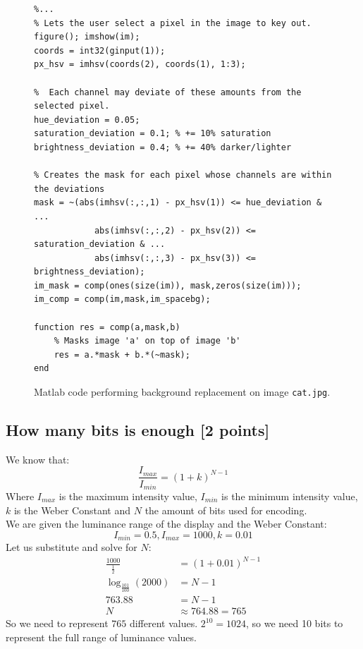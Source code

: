 \documentclass[tikz,14pt,fleqn]{article}
\begin{document}
\begin{figure}[h!]
    \begin{verbatim} 
%...
% Lets the user select a pixel in the image to key out.
figure(); imshow(im);
coords = int32(ginput(1));
px_hsv = imhsv(coords(2), coords(1), 1:3);

%  Each channel may deviate of these amounts from the selected pixel.
hue_deviation = 0.05;
saturation_deviation = 0.1; % += 10% saturation
brightness_deviation = 0.4; % += 40% darker/lighter

% Creates the mask for each pixel whose channels are within the deviations
mask = ~(abs(imhsv(:,:,1) - px_hsv(1)) <= hue_deviation & ...
            abs(imhsv(:,:,2) - px_hsv(2)) <= saturation_deviation & ...
            abs(imhsv(:,:,3) - px_hsv(3)) <= brightness_deviation);
im_mask = comp(ones(size(im)), mask,zeros(size(im)));
im_comp = comp(im,mask,im_spacebg);

function res = comp(a,mask,b)
    % Masks image 'a' on top of image 'b'
    res = a.*mask + b.*(~mask);
end
    \end{verbatim}
\caption{Matlab code performing background replacement on image \texttt{cat.jpg}.}
\end{figure}

\subsection{How many bits is enough [2 points]}
We know that:
$$\frac{I_{max}}{I_{min}} = (1+k)^{N-1}$$
Where $I_{max}$ is the maximum intensity value, $I_{min}$ is the minimum intensity value, $k$ is the Weber Constant and $N$ the amount of bits used for encoding.\\
We are given the luminance range of the display and the Weber Constant:
$$I_{min} = 0.5, I_{max} = 1000, k = 0.01$$
Let us substitute and solve for $N$:
\begin{align*}
    \frac{1000}{\frac{1}{2}} &= (1+0.01)^{N-1}\\
    \log_{\frac{101}{100}}(2000) &= N-1\\
    763.88 &= N - 1\\
    N &\approx 764.88 = 765
\end{align*}
So we need to represent $765$ different values. $2^{10} = 1024$, so we need 10 bits to represent the full range of luminance values.
\end{document}
